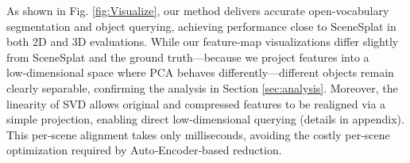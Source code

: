 \documentclass[runningheads]{llncs}
\begin{document}
As shown in Fig. \ref{fig:Visualize}, our method delivers accurate open‑vocabulary segmentation and object querying, achieving performance close to SceneSplat in both 2D and 3D evaluations. While our feature‑map visualizations differ slightly from SceneSplat and the ground truth—because we project features into a low‑dimensional space where PCA behaves differently—different objects remain clearly separable, confirming the analysis in Section \ref{sec:analysis}. Moreover, the linearity of SVD allows original and compressed features to be realigned via a simple projection, enabling direct low‑dimensional querying (details in appendix). This per‑scene alignment takes only milliseconds, avoiding the costly per‑scene optimization required by Auto‑Encoder‑based reduction.
\end{document}
